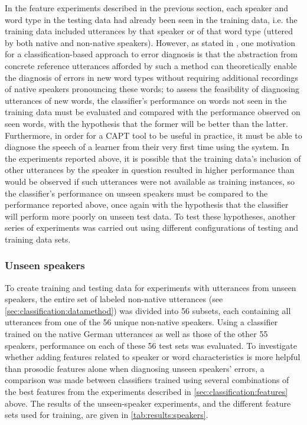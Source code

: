 	In the feature experiments described in the previous section, each speaker and word type in the testing data had already been seen in the training data, i.e. the training data included utterances by that speaker or of that word type (uttered by both native and non-native speakers). However, as stated in , one motivation for a classification-based approach to error diagnosis is that the abstraction from concrete reference utterances afforded by such a method can theoretically enable the diagnosis of errors in new word types without requiring additional recordings of native speakers pronouncing these words; to assess the feasibility of diagnosing utterances of new words, the classifier's performance on words not seen in the training data must be evaluated and compared with the performance observed on seen words, with the hypothesis that the former will be better than the latter. Furthermore, in order for a CAPT tool to be useful in practice, it must be able to diagnose the speech of a learner from their very first time using the system. In the experiments reported above, it is possible that the training data's inclusion of other utterances by the speaker in question resulted in higher performance than would be observed if such utterances were not available as training instances, so the classifier's performance on unseen speakers must be compared to the performance reported above, once again with the hypothesis that the classifier will perform more poorly on unseen test data. To test these hypotheses, another series of experiments was carried out using different configurations of testing and training data sets. 
	
	
	\subsubsection{Unseen speakers}	
	
	To create training and testing data for experiments with utterances from unseen speakers, the entire set of labeled non-native utterances (see \cref{sec:classification:datamethod}) was divided into 56 subsets, each containing all utterances from one of the 56 unique non-native speakers. Using a classifier trained on the native German utterances as well as those of the other 55 speakers, performance on each of these 56 test sets was evaluated. To investigate whether adding features related to speaker or word characteristics is more helpful than prosodic features alone when diagnosing unseen speakers' errors, a comparison was made between classifiers trained using several combinations of the best features from the experiments described in \cref{sec:classification:features} above. The results of the unseen-speaker experiments, and the different feature sets used for training, are given in \cref{tab:results:speakers}.
		
